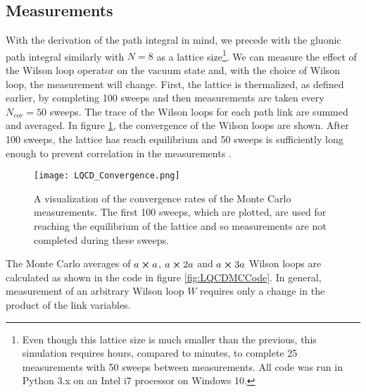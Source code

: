 \documentclass[11pt]{article}
\begin{document}
\subsection{Measurements}
With the derivation of the path integral in mind, we precede with the gluonic path integral similarly with $N=8$ as a lattice size\footnote{Even though this lattice size is much smaller than the previous, this simulation requires hours, compared to minutes, to complete 25 measurements with 50 sweeps between measurements. All code was run in Python 3.x on an Intel i7 processor on Windows 10.}. We can measure the effect of the Wilson loop operator on the vacuum state and, with the choice of Wilson loop, the measurement will change. First, the lattice is thermalized, as defined earlier, by completing 100 sweeps and then measurements are taken every $N_{cor}=50$ sweeps. The trace of the Wilson loops for each path link are summed and averaged. In figure \ref{fig:LQCDConv}, the convergence of the Wilson loops are shown. After 100 sweeps, the lattice has reach equilibrium and 50 sweeps is sufficiently long enough to prevent correlation in the measurements \cite{MainPaper}.

\begin{figure}[h]
	\centering
	\texttt{[image: LQCD\_Convergence.png]}
	\caption{A visualization of the convergence rates of the Monte Carlo measurements. The first 100 sweeps, which are plotted, are used for reaching the equilibrium of the lattice and so measurements are not completed during these sweeps.}
	\label{fig:LQCDConv}
\end{figure}

The Monte Carlo averages of $a\cross a$, $a\cross2a$ and $a\cross3a$ Wilson loops are calculated as shown in the code in figure \ref{fig:LQCDMCCode}. In general, measurement of an arbitrary Wilson loop $W$ requires only a change in the product of the link variables.
\end{document}
